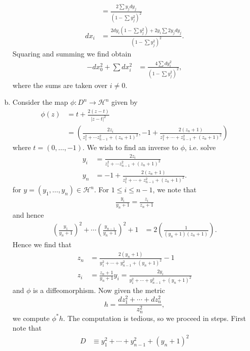 \documentclass{../mathnotes}
\begin{document}
\begin{enumerate}[(a)]
\begin{align*}
            &= \frac{2\sum y_jdy_j}{(1-\sum y_j^2)^2}\\
            dx_i &= \frac{2dy_i(1-\sum y_j^2)+2y_i\sum 2y_jdy_j}{(1-\sum y_j^2)^2}.
        \end{align*}
        Squaring and summing we find obtain
        \begin{align*}
           -dx_0^2+\sum dx_i^2 &= \frac{4\sum dy_i^2}{(1-\sum y_j^2)^2},
        \end{align*}
        where the sums are taken over $i\neq0$.
    \item Consider the map $\phi:D^n\to\mathcal{H}^n$ given by
        \begin{align*}
            \phi(z) &= t+\frac{2(z-t)}{|z-t|^2}\\
            &= \left( \frac{2z_i}{z_1^2+\cdots z_{n-1}^2+(z_n+1)^2}, -1+\frac{2(z_n+1)}{z_1^2+\cdots+z_{n-1}^2+(z_n+1)^2}  \right)
        \end{align*}
        where $t=(0,\ldots,-1)$. We wish to find an inverse to $\phi$, i.e. solve
        \begin{align*}
            y_i &= \frac{2z_i}{z_1^2+\cdots z_{n-1}^2+(z_n+1)^2}\\
            y_n &= -1+\frac{2(z_n+1)}{z_1^2+\cdots+z_{n-1}^2+(z_n+1)^2}.
        \end{align*}
        for $y=(y_1,\ldots,y_n)\in\mathcal{H}^n$. For $1\leq i\leq n-1$, we note that
        \begin{align*}
            \frac{y_i}{y_n+1} = \frac{z_i}{z_n + 1}
        \end{align*}
        and hence
        \begin{align*}
            \left( \frac{y_1}{y_n+1} \right)^2+\cdots \left( \frac{y_{n-1}}{y_n+1} \right)^2+1 &= 2\left( \frac{1}{(y_n+1)(z_n+1)} \right).
        \end{align*}
        Hence we find that
        \begin{align*}
            z_n &= \frac{2(y_n+1)}{y_1^2+\cdots+y_{n-1}^2+(y_n+1)^2}-1\\
            z_i &= \frac{z_{n}+1}{y_n+1}y_i = \frac{2y_i}{y_1^2+\cdots+y_{n-1}^2+(y_n+1)^2}
        \end{align*}
        and $\phi$ is a diffeomorphism. Now given the metric
        \[h=\frac{dz_1^2+\cdots + dz_n^2}{z_n^2},\]
        we compute $\phi^*h$. The computation is tedious, so we proceed in steps. First note that
        \begin{align*}
            D&\equiv y_1^2+\cdots+y_{n-1}^2+(y_n+1)^2\\

\end{align*}
\end{enumerate}
\end{document}
